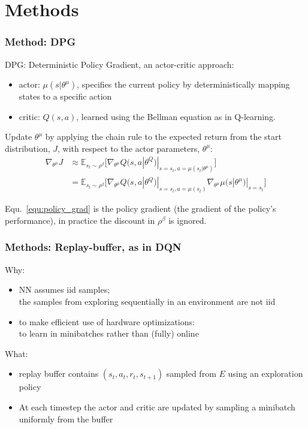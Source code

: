 \section{Methods}

\begin{frame}
\frametitle{Method: DPG \cite{Silver2014}}

DPG: Deterministic Policy Gradient, an actor-critic approach:
\begin{itemize}
  \item actor: $\mu (s|\theta^{\mu})$,
  specifies the current policy by deterministically mapping states to a specific action
  \item critic: $Q(s, a)$,
  learned using the Bellman equation as in Q-learning.
\end{itemize}


Update $\theta^{\mu}$ by applying the chain rule to the expected return from
the start distribution, $J$, with respect to the actor parameters, $\theta^{\mu}$:
\begin{equation} \label{equ:policy_grad}
\begin{split}
\nabla_{\theta^{\mu}} J &  \approx \mathbb{E}_{s_t \sim \rho^{\beta}} \Big[ \nabla_{\theta^{\mu}} Q(s,a|\theta^Q) |_{s = s_t, a = \mu(s_t|\theta^{\mu})} \Big] \\
  & = \mathbb{E}_{s_t \sim \rho^{\beta}} \Big[ \nabla_{\theta^{\mu}} Q(s,a|\theta^Q) |_{s = s_t, a = \mu(s_t)} \nabla_{\theta^{\mu}} \mu(s|\theta^{\mu})|_{s = s_t} \Big]
\end{split}
\end{equation}

Equ.~\ref{equ:policy_grad} is the policy gradient (the gradient of the policy's performance),
in practice the discount in $\rho^{\beta}$ is ignored.

\end{frame}

\begin{frame}
\frametitle{Methods: Replay-buffer, as in DQN~\cite{Mnih2013}}
Why:
\begin{itemize}
\item NN assumes iid samples;\\
the samples from exploring sequentially in an environment are not iid
\item to make efficient use of hardware optimizations:\\
to learn in minibatches rather than (fully) online
\end{itemize}

What:
\begin{itemize}
  \item replay buffer contains $(s_t, a_t, r_t, s_{t+1})$ sampled from $E$ using an exploration policy
  \item At each timestep the actor and critic are updated by sampling a minibatch uniformly from the buffer
\end{itemize}

\end{frame}

